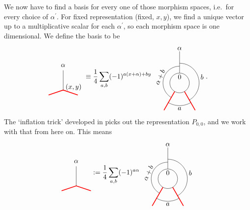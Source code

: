 We now have to find a basis for every one of those morphism spaces, i.e.\ for every choice of $\alpha^\prime$. For fixed representation (fixed, $x,y$), we find a unique vector up to a multiplicative scalar for each $\alpha^\prime$, so each morphism space is one dimensional. We define the basis to be
	\begin{equation}
		\begin{tikzpicture}[scale=1,baseline=(current bounding box.center)]
			\draw[red,line width=0.4mm] (0,-.25) -- (.75,0) -- (1.5,-.25);
			\draw (0.75,0) -- (0.75,1) node [pos=1.25] {$\alpha$};
			\node[above,right] at (.75,.15) {$(x,y)$};
		\end{tikzpicture}\equiv
		\frac{1}{4}
		\sum_{a,b}(-1)^{a(x+\alpha)+b y}
		\begin{tikzpicture}[scale=1,baseline=(current bounding box.center)]
		\draw (0,0) circle (0.5cm);
		\draw[red,line width=0.4mm]
		\foreach \a in {-60, -120} {
			(\a:0.5) -- (\a:1.6)
		};
		\draw ([shift=(-60:1cm)]0,0) arc (-60:90:1cm);
		\draw ([shift=(-120:1.15cm)]0,0) arc (-120:-60:1.15cm);
		\draw ([shift=(240:0.85cm)]0,0) arc (240:90:0.85cm);
		\draw[] (90:0.5) -- (90:1.6);
		\node at (90:.3cm){$0$};\node at (90:1.75cm){$\alpha$};
		\node[rotate=65] at (-1,0.3) {$\alpha+b$};
		\node at (1.15,0.3) {$b$};
		\node at (0,-1.3) {$a$};
		\end{tikzpicture}.
	\end{equation}
The `inflation trick' developed in \cite{BBJ18,BB19a,BB19b} picks out the representation $P_{0,0}$, and we work with that from here on. This means
	\begin{equation}
	\begin{tikzpicture}[scale=1,baseline=(current bounding box.center)]
	\draw[red,line width=0.4mm] (0,-.25) -- (.75,0) -- (1.5,-.25);
	\draw (0.75,0) -- (0.75,1) node [pos=1.25] {$\alpha$};
	\end{tikzpicture}:=
	\frac{1}{4}
	\sum_{a,b}(-1)^{a\alpha}
	\begin{tikzpicture}[scale=1,baseline=(current bounding box.center)]
	\draw (0,0) circle (0.5cm);
	\draw[red,line width=0.4mm]
	\foreach \a in {-60, -120} {
		(\a:0.5) -- (\a:1.6)
	};
	\draw ([shift=(-60:1cm)]0,0) arc (-60:90:1cm);
	\draw ([shift=(-120:1.15cm)]0,0) arc (-120:-60:1.15cm);
	\draw ([shift=(240:0.85cm)]0,0) arc (240:90:0.85cm);
	\draw[] (90:0.5) -- (90:1.6);
	\node at (90:.3cm){$0$};\node at (90:1.75cm){$\alpha$};
	\node[rotate=65] at (-1,0.3) {$\alpha+b$};
	\node at (1.15,0.3) {$b$};
	\node at (0,-1.3) {$a$};
	\end{tikzpicture}
	\end{equation}

